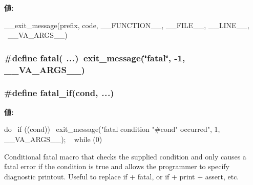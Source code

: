 \label{base_2misc_8hh_a6b2097421f31dc3c2920ac8a335b8197}
{\bfseries 値:}
\begin{DoxyCode}
__exit_message(prefix, code, __FUNCTION__, __FILE__, __LINE__, \
                   __VA_ARGS__)
\end{DoxyCode}
\hypertarget{base_2misc_8hh_acad519418dbfdd70c1208711e609c80e}{
\subsubsection[{fatal}]{\setlength{\rightskip}{0pt plus 5cm}\#define fatal( {\em ...})~exit\_\-message(\char`\"{}fatal\char`\"{}, -\/1, \_\-\_\-VA\_\-ARGS\_\-\_\-)}}
\label{base_2misc_8hh_acad519418dbfdd70c1208711e609c80e}
\hypertarget{base_2misc_8hh_a2127c4f5f05a25aea5ffc00677fc3ffe}{
\subsubsection[{fatal\_\-if}]{\setlength{\rightskip}{0pt plus 5cm}\#define fatal\_\-if(cond, \/   {\em ...})}}
\label{base_2misc_8hh_a2127c4f5f05a25aea5ffc00677fc3ffe}
{\bfseries 値:}
\begin{DoxyCode}
do { \
        if ((cond)) \
            exit_message("fatal condition "#cond" occurred", 1, __VA_ARGS__); \
    } while (0)
\end{DoxyCode}
Conditional fatal macro that checks the supplied condition and only causes a fatal error if the condition is true and allows the programmer to specify diagnostic printout. Useful to replace if + fatal, or if + print + assert, etc.


